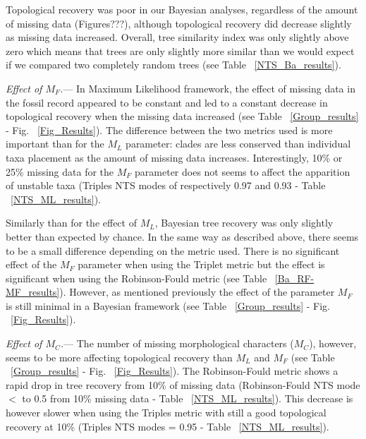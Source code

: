 \documentclass[12pt,letterpaper]{article}
\renewcommand{\subsubsection}[1]{%
\vspace{2ex}
\noindent
\textit{#1.}---}
\begin{document}
Topological recovery was poor in our Bayesian analyses, regardless of the amount of missing data (Figures???), although topological recovery did decrease slightly as missing data increased. Overall, tree similarity index was only slightly above zero which means that trees are only slightly more similar than we would expect if we compared two completely random trees (see Table ~\ref{NTS_Ba_results}). 


\subsubsection{Effect of $M_F$}
In Maximum Likelihood framework, the effect of missing data in the fossil record appeared to be constant and led to a constant decrease in topological recovery when the missing data increased (see Table ~\ref{Group_results} - Fig. ~\ref{Fig_Results}).
The difference between the two metrics used is more important than for the $M_L$ parameter: clades are less conserved than individual taxa placement as the amount of missing data increases.
Interestingly, 10\% or 25\% missing data for the $M_F$ parameter does not seems to affect the apparition of unstable taxa (Triples NTS modes of respectively 0.97 and 0.93 - Table ~\ref{NTS_ML_results}).

Similarly than for the effect of $M_L$, Bayesian tree recovery was only slightly better than expected by chance.
In the same way as described above, there seems to be a small difference depending on the metric used.
There is no significant effect of the $M_F$ parameter when using the Triplet metric but the effect is significant when using the Robinson-Fould metric (see Table ~\ref{Ba_RF-MF_results}).
However, as mentioned previously the effect of the parameter $M_F$ is still minimal in a Bayesian framework (see Table ~\ref{Group_results} - Fig. ~\ref{Fig_Results}).

\subsubsection{Effect of $M_C$}
The number of missing morphological characters ($M_C$), however, seems to be more affecting topological recovery than $M_L$ and $M_F$ (see Table ~\ref{Group_results} - Fig. ~\ref{Fig_Results}).
The Robinson-Fould metric shows a rapid drop in tree recovery from 10\% of missing data (Robinson-Fould NTS mode $<$ to 0.5 from 10\% missing data - Table ~\ref{NTS_ML_results}).
This decrease is however slower when using the Triples metric with still a good topological recovery at 10\%  (Triples NTS modes = 0.95 - Table ~\ref{NTS_ML_results}).
\end{document}
